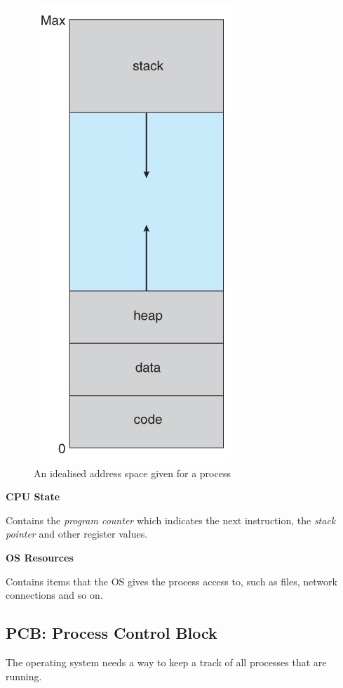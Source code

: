 \documentclass{article}
\begin{document}
\begin{figure}[H]
  \centering
  \includegraphics[scale=0.64]{addressspace}
  \caption{An idealised address space given for a process}
\end{figure}

\textbf{CPU State}

Contains the \textit{program counter} which indicates the next instruction, the \textit{stack pointer} and other register values.

\textbf{OS Resources}

Contains items that the OS gives the process access to, such as files, network connections and so on.

\subsection{PCB: Process Control Block}

The operating system needs a way to keep a track of all processes that are running.
\end{document}
